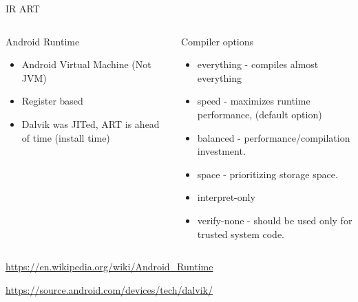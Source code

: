 %
\begin{Frame}{IR ART}
  \begin{columns}[t]
    \begin{column}{\BW} %
      \begin{block}{Android Runtime}
        \begin{itemize}
        \item Android Virtual Machine (Not JVM)
        \item Register based
        \item Dalvik was JITed, ART is ahead of time (install time)
        \end{itemize}
      \end{block} 
    \end{column}
    
    \begin{column}{\BW} %
      \begin{block}{Compiler options}
        \begin{itemize}
        \item everything - compiles almost everything
        \item speed - maximizes runtime performance, (default option)
        \item balanced -  performance/compilation investment.
        \item space - prioritizing storage space.
        \item interpret-only
        \item verify-none - should be used only for trusted system code. 

        \end{itemize}
      \end{block}   
    \end{column}
  \end{columns}  
\url{https://en.wikipedia.org/wiki/Android_Runtime}

\url{https://source.android.com/devices/tech/dalvik/}
\end{Frame}


